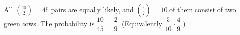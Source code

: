 All $\binom{10}{2}=45$ pairs are equally likely, and $\binom52=10$ of them consist of two green cows. The probability is $\dfrac{10}{45}=\boxed{\dfrac{2}{9}}$. (Equivalently $\dfrac{5}{10}\cdot\dfrac{4}{9}$.)

